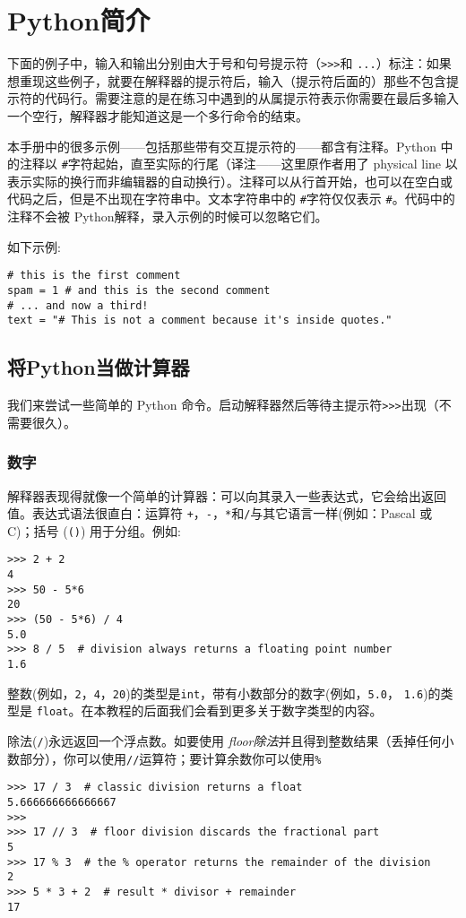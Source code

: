\chapter{Python简介\label{InformalIntroduction}}
下面的例子中，输入和输出分别由大于号和句号提示符（\verb|>>>|和 \verb|...|）标注：如果想重现这些例子，就要在解释器的提示符后，输入（提示符后面的）那些不包含提示符的代码行。需要注意的是在练习中遇到的从属提示符表示你需要在最后多输入一个空行，解释器才能知道这是一个多行命令的结束。

本手册中的很多示例——包括那些带有交互提示符的——都含有注释。Python 中的注释以 \verb|#|字符起始，直至实际的行尾（译注——这里原作者用了 physical line 以表示实际的换行而非编辑器的自动换行）。注释可以从行首开始，也可以在空白或代码之后，但是不出现在字符串中。文本字符串中的 \verb|#|字符仅仅表示 \verb|#|。代码中的注释不会被 Python解释，录入示例的时候可以忽略它们。

如下示例:
\begin{lstlisting}
# this is the first comment
spam = 1 # and this is the second comment
# ... and now a third!
text = "# This is not a comment because it's inside quotes."
\end{lstlisting}
\section{将Python当做计算器}
我们来尝试一些简单的 Python 命令。启动解释器然后等待主提示符\verb|>>>|出现（不需要很久）。
\subsection{数字}
解释器表现得就像一个简单的计算器：可以向其录入一些表达式，它会给出返回值。表达式语法很直白：运算符 \verb|+|，\verb|-|，\verb|*|和\verb|/|与其它语言一样(例如：Pascal 或 C)；括号 (\verb|()|) 用于分组。例如:
\begin{lstlisting}
>>> 2 + 2
4
>>> 50 - 5*6
20
>>> (50 - 5*6) / 4
5.0
>>> 8 / 5  # division always returns a floating point number
1.6
\end{lstlisting}
整数(例如，\verb|2|，\verb|4|，\verb|20|)的类型是\texttt{int}，带有小数部分的数字(例如，\verb|5.0|， \verb|1.6|)的类型是 \texttt{float}。在本教程的后面我们会看到更多关于数字类型的内容。

除法(\verb|/|)永远返回一个浮点数。如要使用 \emph{floor除法}并且得到整数结果（丢掉任何小数部分），你可以使用\verb|//|运算符；要计算余数你可以使用\verb|%|
\begin{lstlisting}
>>> 17 / 3  # classic division returns a float
5.666666666666667
>>>
>>> 17 // 3  # floor division discards the fractional part
5
>>> 17 % 3  # the % operator returns the remainder of the division
2
>>> 5 * 3 + 2  # result * divisor + remainder
17
\end{lstlisting}

